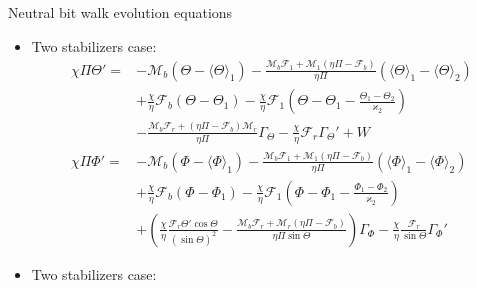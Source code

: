 \documentclass{beamer}
\begin{document}
\begin{frame}{Neutral bit walk evolution equations}\setlength{\leftmargini}{0pt}


	\begin{itemize}
		\item <1|only@1> [] \vspace{-1.0cm} Two stabilizers case: \footnotesize
		\begin{equation}
		\begin{aligned}
		\chi \Pi \Theta ' =  &- \mathcal{M}_b(\Theta-\langle\Theta \rangle_1)-\frac{{{\mathcal{M}_b}{\mathcal{F}_1} + {\mathcal{M}_1}\left( {\eta \Pi  - {\mathcal{F}_b}} \right)}}{{\eta \Pi }}\left( {{\langle{\Theta} \rangle_1} - {\langle{\Theta} \rangle_{2}}} \right)
		\\
		&+\frac{\chi }{\eta }{\mathcal{F}_b}\left( {{\Theta} - {{\Theta}_1}} \right)
		- \frac{\chi }{\eta }{\mathcal{F}_1}\left( {{{{{\Theta}} - {{\Theta}_1}}} - \frac{{{{\Theta}_1} - {{\Theta}_{2}}}}{{{\varkappa _{2}}}}} \right)
		\\
		&- \frac{{{\mathcal{M}_b}{\mathcal{F}_r} + (\eta \Pi  - {\mathcal{F}_b}){\mathcal{M}_r}}}{{\eta \Pi }}{\Gamma _{\Theta}} - \frac{\chi }{\eta }{\mathcal{F}_r}\Gamma_{\!\Theta}' + W
		\\
		\chi \Pi \Phi ' =  &- {\mathcal{M}_b}\left( {\Phi  - {\langle{\Phi} \rangle_1}} \right)-\frac{{{\mathcal{M}_b}{\mathcal{F}_1} + {\mathcal{M}_1}\left( {\eta \Pi  - {\mathcal{F}_b}} \right)}}{{\eta \Pi }}\left( {{\langle{\Phi} \rangle_1} - {\langle{\Phi} \rangle_{2}}} \right)
		\\
		&+\frac{\chi }{\eta }{\mathcal{F}_b}\left( {{\Phi} - {{\Phi}_1}} \right)
		- \frac{\chi }{\eta }{\mathcal{F}_1}\left( {{{{{\Phi}} - {{\Phi}_1}}} - \frac{{{{\Phi}_1} - {{\Phi}_{2}}}}{{{\varkappa _{2}}}}} \right)
		\\
		&+ \left( {\frac{\chi }{\eta }\frac{{{\mathcal{F}_r}\Theta '\cos \Theta }}{{{{\left( {\sin \Theta } \right)}^2}}} - \frac{{{\mathcal{M}_b}{\mathcal{F}_r} + {\mathcal{M}_r}\left( {\eta \Pi  - {\mathcal{F}_b}} \right)}}{{\eta \Pi \sin \Theta }}} \right){\Gamma _{\Phi}} - \frac{\chi }{\eta }\frac{{{\mathcal{F}_r}}}{{\sin \Theta }}\Gamma_{\!\Phi}'
		\end{aligned}
		\nonumber
		\end{equation}
		\item <2|only@2> [] \vspace{-0.4cm} Two stabilizers case: \footnotesize
	\begin{equation}
			\begin{aligned}

\end{aligned}
\end{equation}
\end{itemize}
\end{frame}
\end{document}
